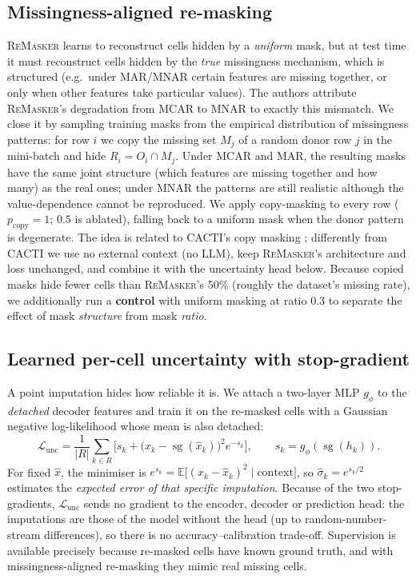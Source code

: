 \documentclass[11pt]{article}
\newcommand{\remasker}{\textsc{ReMasker}}
\newcommand{\sg}{\operatorname{sg}}
\begin{document}
\subsection{Missingness-aligned re-masking}
\remasker{} learns to reconstruct cells hidden by a \emph{uniform} mask, but at test time it must reconstruct cells hidden by the \emph{true} missingness mechanism, which is structured (e.g.\ under MAR/MNAR certain features are missing together, or only when other features take particular values). The authors attribute \remasker's degradation from MCAR to MNAR to exactly this mismatch. We close it by sampling training masks from the empirical distribution of missingness patterns: for row $i$ we copy the missing set $M_j$ of a random donor row $j$ in the mini-batch and hide $R_i=O_i\cap M_j$. Under MCAR and MAR, the resulting masks have the same joint structure (which features are missing together and how many) as the real ones; under MNAR the patterns are still realistic although the value-dependence cannot be reproduced. We apply copy-masking to every row ($p_{\text{copy}}=1$; $0.5$ is ablated), falling back to a uniform mask when the donor pattern is degenerate. The idea is related to CACTI's copy masking \citep{cacti}; differently from CACTI we use no external context (no LLM), keep \remasker's architecture and loss unchanged, and combine it with the uncertainty head below. Because copied masks hide fewer cells than \remasker's 50\% (roughly the dataset's missing rate), we additionally run a \textbf{control} with uniform masking at ratio $0.3$ to separate the effect of mask \emph{structure} from mask \emph{ratio}.

\subsection{Learned per-cell uncertainty with stop-gradient}
A point imputation hides how reliable it is. We attach a two-layer MLP $g_\phi$ to the \emph{detached} decoder features and train it on the re-masked cells with a Gaussian negative log-likelihood whose mean is also detached:
\[
\mathcal{L}_{\text{unc}}=\frac{1}{|R|}\sum_{k\in R}\Big[s_k+\big(x_k-\sg(\hat x_k)\big)^2 e^{-s_k}\Big],\qquad s_k=g_\phi(\sg(h_k)).
\]
For fixed $\hat x$, the minimiser is $e^{s_k}=\mathbb{E}\big[(x_k-\hat x_k)^2\mid\text{context}\big]$, so $\hat\sigma_k=e^{s_k/2}$ estimates the \emph{expected error of that specific imputation}. Because of the two stop-gradients, $\mathcal{L}_{\text{unc}}$ sends no gradient to the encoder, decoder or prediction head: the imputations are those of the model without the head (up to random-number-stream differences), so there is no accuracy--calibration trade-off. Supervision is available precisely because re-masked cells have known ground truth, and with missingness-aligned re-masking they mimic real missing cells.
\end{document}
